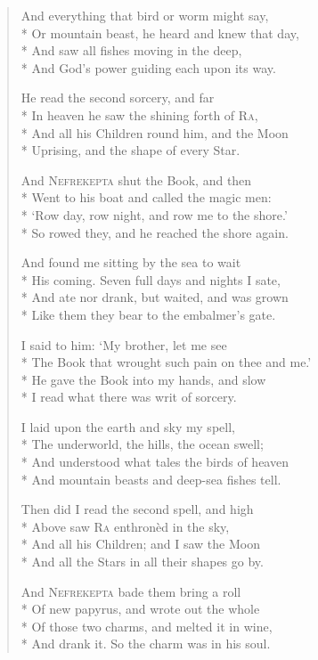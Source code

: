 \documentclass[12pt]{article}
\newcommand{\vin}{\hspace{1em}}
\begin{document}
\begin{verse}
And everything that bird or worm might say,\\*
Or mountain beast, he heard and knew that day,\\*
\vin And saw all fishes moving in the deep,\\*
And God's power guiding each upon its way.

He read the second sorcery, and far\\*
In heaven he saw the shining forth of \textsc{Ra},\\*
\vin And all his Children round him, and the Moon\\*
Uprising, and the shape of every Star.

And \textsc{Nefrekepta} shut the Book, and then\\*
Went to his boat and called the magic men:\\*
\vin `Row day, row night, and row me to the shore.'\\*
So rowed they, and he reached the shore again.

And found me sitting by the sea to wait\\*
His coming. Seven full days and nights I sate,\\*
\vin And ate nor drank, but waited, and was grown\\*
Like them they bear to the embalmer's gate.

I said to him: `My brother, let me see\\*
The Book that wrought such pain on thee and me.'\\*
\vin He gave the Book into my hands, and slow\\*
I read what there was writ of sorcery.

I laid upon the earth and sky my spell,\\*
The underworld, the hills, the ocean swell;\\*
\vin And understood what tales the birds of heaven\\*
And mountain beasts and deep-sea fishes tell.

Then did I read the second spell, and high\\*
Above saw \textsc{Ra} enthron\`{e}d in the sky,\\*
\vin And all his Children; and I saw the Moon\\*
And all the Stars in all their shapes go by.

And \textsc{Nefrekepta} bade them bring a roll\\*
Of new papyrus, and wrote out the whole\\*
\vin Of those two charms, and melted it in wine,\\*
And drank it. So the charm was in his soul.


\end{verse}
\end{document}
